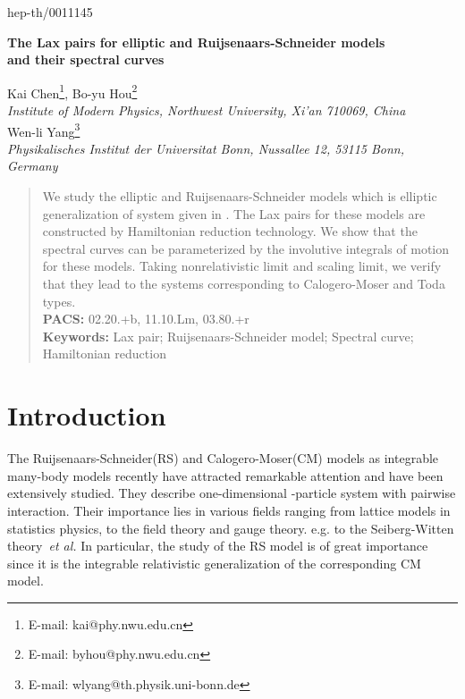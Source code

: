\documentclass[a4paper,12pt]{article}
\begin{document}
\hfill\vbox{\hbox{hep-th/0011145}}

\begin{center}
{\Large	  \bf  The Lax pairs for elliptic \coordHE{} and \coordHE{}
Ruijsenaars-Schneider models \\and their spectral curves}
\end{center}

\begin{center}
Kai Chen\footnote{E-mail: kai@phy.nwu.edu.cn},
Bo-yu Hou\footnote{E-mail: byhou@phy.nwu.edu.cn}\\
{\small \it Institute of Modern Physics, Northwest University, Xi'an
710069, China}\\
Wen-li Yang\footnote{E-mail: wlyang@th.physik.uni-bonn.de}\\
{\small{\it  Physikalisches Institut der Universitat Bonn, Nussallee
12, 53115 Bonn, Germany }}
\end{center}


\begin{abstract}
We study the elliptic \coordHE{} and \coordHE{}
Ruijsenaars-Schneider models which is elliptic
generalization of system given in \cite{Che00}. The Lax
pairs for these models are constructed by Hamiltonian
reduction technology. We show that the spectral curves can
be parameterized by the involutive integrals of	 motion for these
models. Taking nonrelativistic limit and scaling limit, we
verify that they lead to the systems corresponding to
Calogero-Moser and Toda types.
\newline\\
{\bf \noindent PACS:} 02.20.+b, 11.10.Lm, 03.80.+r\\
{\bf \noindent Keywords:} Lax pair; Ruijsenaars-Schneider
model; Spectral curve; Hamiltonian reduction\\
\end{abstract}

\section{Introduction}

\setcounter{equation}{0} The Ruijsenaars-Schneider(RS) and
Calogero-Moser(CM) models as integrable many-body models
recently have attracted remarkable attention and have been
extensively studied. They describe one-dimensional
\coordHE{}-particle system with pairwise interaction. Their
importance lies in various fields ranging from lattice
models in statistics physics\cite{h1,nksr}, to the field
theory and gauge theory\cite {gm,n}. e.g. to the
Seiberg-Witten theory\cite{bm1}\textit{\ et al.} In particular,
the study of the RS model is of great importance since it is
the integrable relativistic generalization of the corresponding
CM model\cite{r1,r2}.
\end{document}
